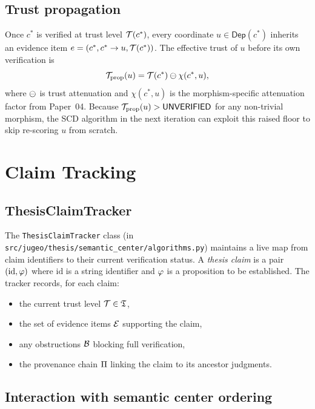 \documentclass[11pt]{article}
\newcommand{\DepSet}{\mathsf{Dep}}          %
\newcommand{\SCD}{\textsc{SCD}}             %
\begin{document}
\subsection{Trust propagation}

Once $c^*$ is verified at trust level $\mathcal{T}(c^*)$, every coordinate
$u \in \DepSet(c^*)$ inherits an evidence item $e = (c^*, c^* \to u,
\mathcal{T}(c^*))$.  The effective trust of $u$ before its own verification
is
\[
  \mathcal{T}_{\mathrm{prop}}(u) = \mathcal{T}(c^*) \ominus \chi(c^*, u),
\]
where $\ominus$ is trust attenuation and $\chi(c^*, u)$ is the
morphism-specific attenuation factor from Paper~04.  Because
$\mathcal{T}_{\mathrm{prop}}(u) > \mathsf{UNVERIFIED}$ for any non-trivial morphism, the
\SCD{} algorithm in the next iteration can exploit this raised floor to
skip re-scoring $u$ from scratch.

\section{Claim Tracking}\label{sec:claims}

\subsection{ThesisClaimTracker}

The \texttt{ThesisClaimTracker} class (in
\texttt{src/jugeo/thesis/semantic\_center/algorithms.py}) maintains a
live map from claim identifiers to their current verification status.
A \emph{thesis claim} is a pair $(\mathrm{id}, \varphi)$ where $\mathrm{id}$
is a string identifier and $\varphi$ is a \JuGeo{} proposition to be
established.  The tracker records, for each claim:
\begin{itemize}[noitemsep]
  \item the current trust level $\mathcal{T} \in \mathfrak{T}$,
  \item the set of evidence items $\mathcal{E}$ supporting the claim,
  \item any obstructions $\mathcal{B}$ blocking full verification,
  \item the provenance chain $\Pi$ linking the claim to its
        ancestor judgments.
\end{itemize}

\subsection{Interaction with semantic center ordering}
\end{document}
